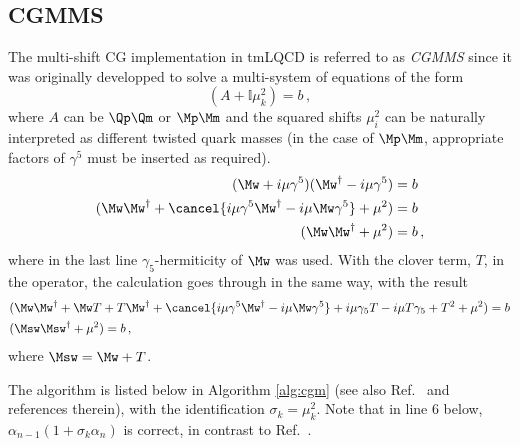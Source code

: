 \subsection{CGMMS}

The multi-shift CG implementation in tmLQCD is referred to as \emph{CGMMS} since it was originally developped to solve a multi-system of equations of the form
\begin{equation}
  ( A + \mathbb{I}\mu_k^2 ) = b \, ,
\end{equation}
where $A$ can be $\Qp\Qm$ or $\Mp\Mm$ and the squared shifts $\mu_i^2$ can be naturally interpreted as different twisted quark masses (in the case of $\Mp\Mm$, appropriate factors of $\gamma^5$ must be inserted as required).
\begin{equation}
  \begin{split}
  ( \Mw + i \mu \gamma^5 )( \Mw^\dagger - i \mu \gamma^5 ) & = b \\
  ( \Mw \Mw^\dagger + \cancel{i\mu\gamma^5 \Mw^\dagger - i \mu \Mw \gamma^5} + \mu^2 ) & = b \\
  ( \Mw \Mw^\dagger + \mu^2 ) & = b \, ,
  \end{split}
\end{equation}
where in the last line $\gamma_5$-hermiticity of $\Mw$ was used.
With the clover term, $T$, in the operator, the calculation goes through in the same way, with the result
\begin{equation}
  \begin{split}
    & ( \Mw \Mw^\dagger + \Mw T + T \Mw^\dagger + \cancel{i\mu\gamma^5 \Mw^\dagger - i \mu \Mw \gamma^5} + i\mu\gamma_5 T - i\mu T \gamma_5 + T^2 + \mu^2 ) = b \\
    & ( \Msw \Msw^\dagger + \mu^2 ) = b \, ,
  \end{split}
\end{equation}
where $\Msw = \Mw + T$.

The algorithm is listed below in Algorithm \ref{alg:cgm} (see also Ref.~\cite{Chiarappa:2006hz}
and references therein), with the identification $\sigma_k = \mu_k^2$.
Note that in line 6 below, $\alpha_{n-1}(1+\sigma_k\alpha_n)$ is correct, in contrast to Ref.~\cite{Chiarappa:2006hz}.

